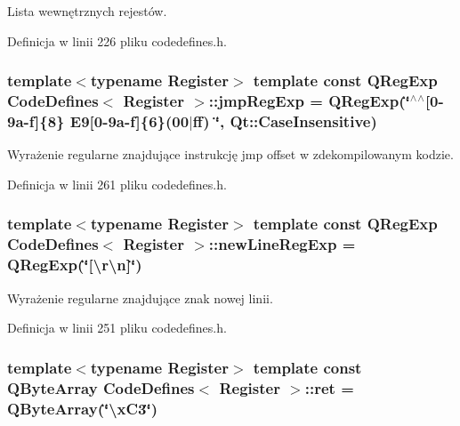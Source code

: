 Lista wewnętrznych rejestów. 



Definicja w linii 226 pliku codedefines.\-h.

\hypertarget{class_code_defines_a2f214288be4f17edf89f463162c59e30}{
\subsubsection[{jmp\-Reg\-Exp}]{\setlength{\rightskip}{0pt plus 5cm}template$<$typename Register$>$ template const Q\-Reg\-Exp {\bf Code\-Defines}$<$ Register $>$\-::jmp\-Reg\-Exp = Q\-Reg\-Exp(\char`\"{}$^\wedge$$^\wedge$\mbox{[}0-\/9a-\/f\mbox{]}\{8\} E9\mbox{[}0-\/9a-\/f\mbox{]}\{6\}(00$\vert$ff) \char`\"{}, Qt\-::\-Case\-Insensitive)\hspace{0.3cm}{\ttfamily [static]}}}\label{class_code_defines_a2f214288be4f17edf89f463162c59e30}


Wyrażenie regularne znajdujące instrukcję jmp offset w zdekompilowanym kodzie. 



Definicja w linii 261 pliku codedefines.\-h.

\hypertarget{class_code_defines_a767cf243acab61bf7c6f1046002425e1}{
\subsubsection[{new\-Line\-Reg\-Exp}]{\setlength{\rightskip}{0pt plus 5cm}template$<$typename Register$>$ template const Q\-Reg\-Exp {\bf Code\-Defines}$<$ Register $>$\-::new\-Line\-Reg\-Exp = Q\-Reg\-Exp(\char`\"{}\mbox{[}\textbackslash{}r\textbackslash{}n\mbox{]}\char`\"{})\hspace{0.3cm}{\ttfamily [static]}}}\label{class_code_defines_a767cf243acab61bf7c6f1046002425e1}


Wyrażenie regularne znajdujące znak nowej linii. 



Definicja w linii 251 pliku codedefines.\-h.

\hypertarget{class_code_defines_ae8c1690d0a6fe53c81dea4c8cad6ca5c}{
\subsubsection[{ret}]{\setlength{\rightskip}{0pt plus 5cm}template$<$typename Register$>$ template const Q\-Byte\-Array {\bf Code\-Defines}$<$ Register $>$\-::ret = Q\-Byte\-Array(\char`\"{}\textbackslash{}x\-C3\char`\"{})\hspace{0.3cm}{\ttfamily [static]}}}\label{class_code_defines_ae8c1690d0a6fe53c81dea4c8cad6ca5c}


